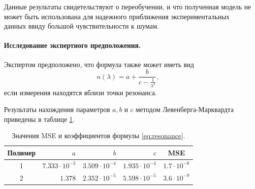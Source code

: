 \documentclass[12pt,a4paper]{article}
\begin{document}
Данные результаты свидетельствуют о переобучении, и что полученная модель не может быть
использована для надежного приближения экспериментальных данных ввиду большой чувствительности
к шумам.

\paragraph{Исследование экспертного предположения.}

Экспертом предположено, что формула также может иметь вид
\begin{equation}
  n(\lambda) = a + \frac{b}{c - \frac{1}{\lambda^2}},
  \label{eq:resonance}
\end{equation}
если измерения находятся вблизи точки резонанса.

Результаты нахождения параметров $a, b$ и $c$ методом Левенберга-Марквардта
приведены в таблице \ref{tabl:resonance_coeffs}.

\begin{table}[h]
  \centering
  \footnotesize
  \begin{tabular}{| c | r | r | r | c |} \hline
	Полимер		& $a$							& $b$					& $c$					& MSE						\\ \hline
	1			& $7.333 \cdot 10^{-3}$		& $3.509 \cdot 10^{-4}$	& $1.935 \cdot 10^{-4}$	& $1.7 \cdot 10^{-8}$		\\ \hline
	2			& $1.378$					& $2.352 \cdot 10^{-5}$	& $5.598 \cdot 10^{-5}$	& $3.6 \cdot 10^{-9}$		\\ \hline
  \end{tabular}
  \caption{Значения MSE и коэффициентов формулы \eqref{eq:resonance}.}
  \label{tabl:resonance_coeffs}
\end{table}
\end{document}
